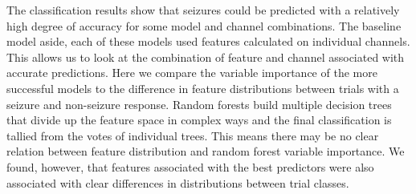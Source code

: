  

The classification results show that seizures could be 
predicted with 
a relatively high degree of accuracy for some model 
and channel combinations. The baseline 
model aside, each of these models used features calculated 
on individual channels. This allows us to look at 
the combination of feature and channel 
associated with accurate predictions. Here 
we compare the variable importance of the more successful 
models to the difference in feature distributions 
between trials with a seizure and non-seizure response.
Random forests build multiple decision trees that divide up the feature space in complex ways and the final classification is
tallied from the votes of individual trees. This means there 
may be no clear relation between feature distribution and 
random forest variable importance. We found, however, that 
features associated with the best predictors were also associated
with clear differences in distributions between trial classes.


